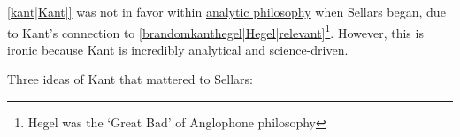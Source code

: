 \ref{kant|Kant|} was not in favor within \href{https://en.wikipedia.org/wiki/Analytic_philosophy}{analytic philosophy} when Sellars began, due to Kant's connection to \ref{brandomkanthegel|Hegel|relevant}\footnote{Hegel was the `Great Bad' of Anglophone philosophy}. However, this is ironic because Kant is incredibly analytical and science-driven.


Three ideas of Kant that mattered to Sellars:
